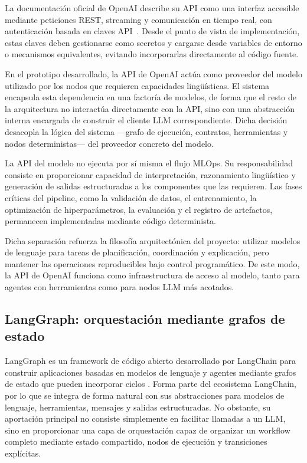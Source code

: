 \documentclass[12pt,a4paper]{article}
\theoremstyle{plain}
\begin{document}
La documentación oficial de OpenAI describe su API como una interfaz accesible mediante peticiones REST, streaming y comunicación en tiempo real, con autenticación basada en claves API~\cite{openai_api_reference}. Desde el punto de vista de implementación, estas claves deben gestionarse como secretos y cargarse desde variables de entorno o mecanismos equivalentes, evitando incorporarlas directamente al código fuente.

En el prototipo desarrollado, la API de OpenAI actúa como proveedor del modelo utilizado por los nodos que requieren capacidades lingüísticas. El sistema encapsula esta dependencia en una factoría de modelos, de forma que el resto de la arquitectura no interactúa directamente con la API, sino con una abstracción interna encargada de construir el cliente LLM correspondiente. Dicha decisión desacopla la lógica del sistema ---grafo de ejecución, contratos, herramientas y nodos deterministas--- del proveedor concreto del modelo.

La API del modelo no ejecuta por sí misma el flujo MLOps. Su responsabilidad consiste en proporcionar capacidad de interpretación, razonamiento lingüístico y generación de salidas estructuradas a los componentes que las requieren. Las fases críticas del pipeline, como la validación de datos, el entrenamiento, la optimización de hiperparámetros, la evaluación y el registro de artefactos, permanecen implementadas mediante código determinista.

Dicha separación refuerza la filosofía arquitectónica del proyecto: utilizar modelos de lenguaje para tareas de planificación, coordinación y explicación, pero mantener las operaciones reproducibles bajo control programático. De este modo, la API de OpenAI funciona como infraestructura de acceso al modelo, tanto para agentes con herramientas como para nodos LLM más acotados.

\subsection{LangGraph: orquestación mediante grafos de estado}

LangGraph es un framework de código abierto desarrollado por LangChain para construir aplicaciones basadas en modelos de lenguaje y agentes mediante grafos de estado que pueden incorporar ciclos \cite{langgraph_docs}. Forma parte del ecosistema LangChain, por lo que se integra de forma natural con sus abstracciones para modelos de lenguaje, herramientas, mensajes y salidas estructuradas. No obstante, su aportación principal no consiste simplemente en facilitar llamadas a un LLM, sino en proporcionar una capa de orquestación capaz de organizar un workflow completo mediante estado compartido, nodos de ejecución y transiciones explícitas.
\end{document}

